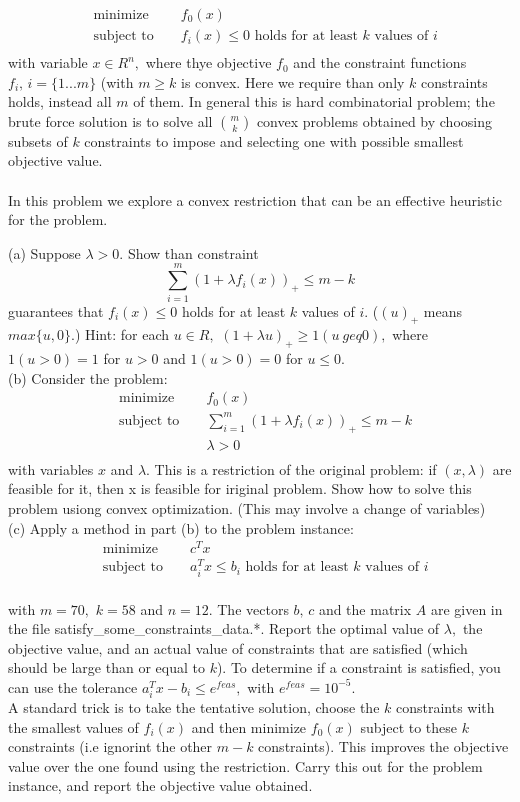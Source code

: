 \documentclass{article}
\begin{document}
\begin{align*}
&\text{minimize } && f_0(x) \\
&\text{subject to } && f_i(x) \leq 0 \text{ holds for at least } k \text{ values of }i\\
\end{align*} 
with variable $x \in R^n,$ where thye objective $f_0$ and the constraint functions $f_i, \, i = \{1...m\} $ (with $m \geq k$ is convex. Here we require than only $k$ constraints holds, instead all $m$ of them. In general this is hard combinatorial problem; the brute force solution is to solve all $m \choose k$ convex problems obtained by choosing subsets of $k$ constraints to impose and selecting one with possible smallest objective value. \\ \\
In this problem we explore a convex restriction that can be an effective heuristic for the problem.

(a) Suppose $\lambda > 0.$ Show than constraint
$$
\sum_{i = 1}^{m} (1 + \lambda f_i(x))_+ \leq m - k
$$
guarantees that $f_i(x) \leq 0 $ holds for at least $k$
values of $i.$ ($(u)_+$ means $max\{u, 0\}.$) Hint: for each $u \in R,$ $(1 + \lambda u)_+ \geq 1(u \ geq 0),$ where $1(u > 0)= 1$ for $u > 0$ and $1(u > 0) = 0$
for $u \leq 0.$\\

(b) Consider the problem:
\begin{align*}
&\text{minimize } && f_0(x) \\
&\text{subject to } && \sum_{i = 1}^{m} (1 + \lambda
 f_i(x))_+ \leq m - k\\
& && \lambda > 0 \\ 
\end{align*} 
with variables $x$ and $\lambda.$ This is a restriction of the original problem: if $(x, \lambda)$ are feasible for it, then x is feasible for iriginal problem. Show how to solve this problem usiong convex optimization. (This may involve a change of variables)
\\

(c) Apply a method in part (b) to the problem instance:
\begin{align*}
&\text{minimize } && c^T x \\
&\text{subject to } && a_i^T x \leq b_i \text{ holds for at least } k \text{ values of }i\\
\end{align*} 

with $m = 70,$ $k = 58$ and $n = 12.$ The vectors 
$b, \, c$ and the matrix $A$ are given in the file satisfy\_some\_constraints\_data.*. Report the optimal value of $\lambda,$ the objective value, and an actual value of constraints that are satisfied (which should be large than or equal to $k$). To determine if a constraint is satisfied, you can use the tolerance 
$a_i^T x - b_i \leq e^{feas},$ with $e^{feas} = 10^{-5}.$ \\
A standard trick is to take the tentative solution, choose the $k$ constraints with the smallest values of 
$f_i(x)$ and then minimize $f_0(x)$ subject to these $k$ constraints (i.e ignorint the other $m - k$ constraints). This improves the objective value over the one found using the restriction. Carry this out for the problem instance, and report the objective value obtained.
\end{document}
